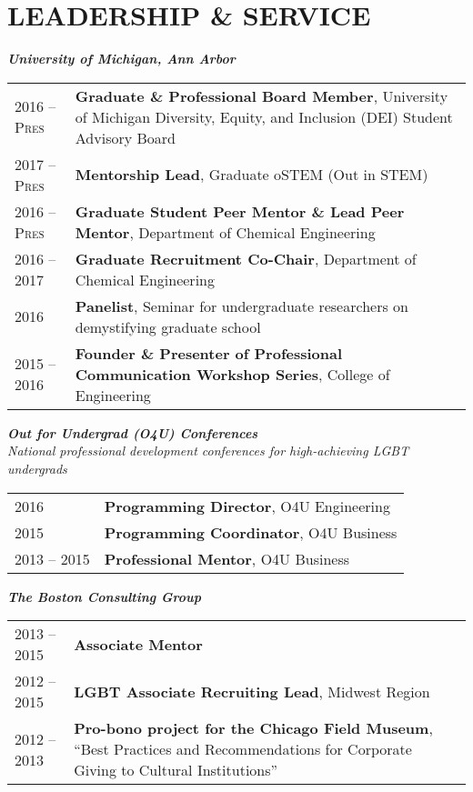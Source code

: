 \documentclass[11pt]{article}
\newcommand{\quotejump}{\vspace{0.5em}}
\begin{document}
\section{LEADERSHIP \& SERVICE}
\textbf{\textit{University of Michigan, Ann Arbor}}\quotejump
\begin{longtable}{R{2.2cm} L{14.8cm}}
2016 -- \textsc{\footnotesize Pres} & \textbf{Graduate \& Professional Board Member}, University of Michigan Diversity, Equity, and Inclusion (DEI) Student Advisory Board \\
2017 -- \textsc{\footnotesize Pres} & \textbf{Mentorship Lead}, Graduate oSTEM (Out in STEM) \\
2016 -- \textsc{\footnotesize Pres} & \textbf{Graduate Student Peer Mentor \& Lead Peer Mentor}, Department of Chemical Engineering \\
2016 -- 2017 & \textbf{Graduate Recruitment Co-Chair}, Department of Chemical Engineering \\
2016 & \textbf{Panelist}, Seminar for undergraduate researchers on demystifying graduate school \\ %
2015 -- 2016 & \textbf{Founder \& Presenter of Professional Communication Workshop Series}, College of Engineering \\
\end{longtable}

\newpage
\textbf{\textit{Out for Undergrad (O4U) Conferences}} \\
\textit{National professional development conferences for high-achieving LGBT undergrads}\quotejump
\begin{longtable}{R{2.2cm} L{14.8cm}}
2016 & \textbf{Programming Director}, O4U Engineering \\
2015 & \textbf{Programming Coordinator}, O4U Business \\
2013 -- 2015 & \textbf{Professional Mentor}, O4U Business \\
\end{longtable}

\textbf{\textit{The Boston Consulting Group}}\quotejump
\begin{longtable}{R{2.2cm} L{14.8cm}}
2013 -- 2015 & \textbf{Associate Mentor} \\
2012 -- 2015 & \textbf{LGBT Associate Recruiting Lead}, Midwest Region \\
2012 -- 2013 & \textbf{Pro-bono project for the Chicago Field Museum}, ``Best Practices and Recommendations for Corporate Giving to Cultural Institutions'' \\
\end{longtable}
\end{document}
